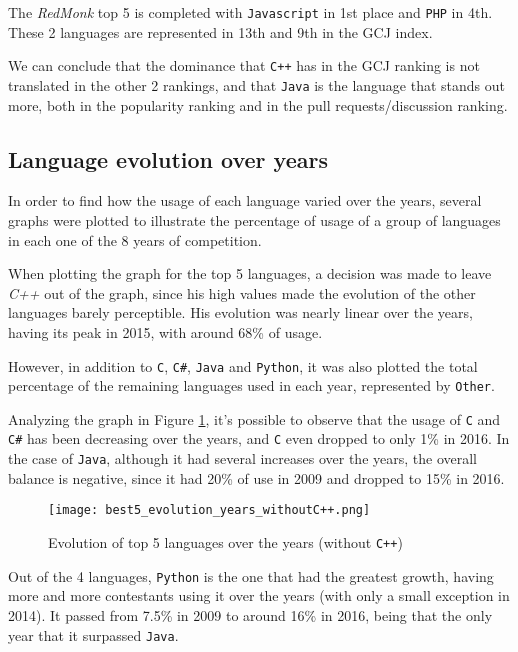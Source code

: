 \documentclass{article}
\begin{document}
\begin{multicols*}{2}
The \textit{RedMonk} top 5 is completed with \texttt{Javascript} in 1st place and \texttt{PHP} in 4th. These 2 languages are represented in 13th and 9th in the GCJ index.

We can conclude that the dominance that \texttt{C++} has in the GCJ ranking is not translated in the other 2 rankings, and that \texttt{Java} is the language that stands out more, both in the popularity ranking and in the pull requests/discussion ranking.


\subsection{Language evolution over years}

In order to find how the usage of each language varied over the years, several graphs were plotted to illustrate the percentage of usage of a group of languages in each one of the 8 years of competition.



When plotting the graph for the top 5 languages, a decision was made to leave \textit{C++} out of the graph, since his high values made the evolution of the other languages barely perceptible. His evolution was nearly linear over the years, having its peak in 2015, with around 68\% of usage.

However, in addition to \texttt{C}, \texttt{C\#}, \texttt{Java} and \texttt{Python}, it was also plotted the total percentage of the remaining languages used in each year, represented by \texttt{Other}.


Analyzing the graph in Figure \ref{fig:top5_evo}, it's possible to observe that the usage of \texttt{C} and \texttt{C\#} has been decreasing over the years, and \texttt{C} even dropped to only 1\% in 2016.
In the case of \texttt{Java}, although it had several increases over the years, the overall balance is negative, since it had 20\% of use in 2009 and dropped to 15\% in 2016.

\begin{figure}[H]
    \centering
    \texttt{[image: best5\_evolution\_years\_withoutC++.png]}
    \caption{Evolution of top 5 languages over the years (without \texttt{C++})}
    \label{fig:top5_evo}
\end{figure}

Out of the 4 languages, \texttt{Python} is the one that had the greatest growth, having more and more contestants using it over the years (with only a small exception in 2014). It passed from 7.5\% in 2009 to around 16\% in 2016, being that the only year that it surpassed \texttt{Java}.


\end{multicols*}
\end{document}
